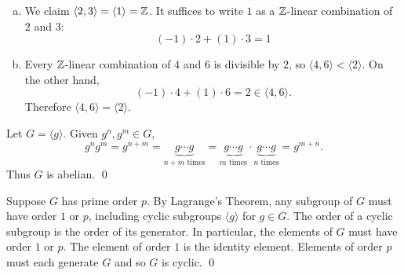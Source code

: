 \documentclass[../algebraNotesMSRI-UP2016.tex]{subfiles}
\begin{document}
\begin{frame}
\begin{enumerate}[(a)]
\item We claim $\langle 2,3\rangle=\langle 1\rangle=\mathbb Z$.  It suffices to write $1$ as a $\mathbb Z$-linear combination of $2$ and $3$:
\[
(-1)\cdot 2+(1)\cdot 3=1
\]
\item Every $\mathbb Z$-linear combination of $4$ and $6$ is divisible by $2$, so $\langle 4,6\rangle<\langle 2\rangle$.  On the other hand,
\[
(-1)\cdot 4 +(1)\cdot 6=2\in\langle 4,6\rangle.
\]
Therefore $\langle 4,6\rangle =\langle 2\rangle$.
\end{enumerate}

\smallGap
{}
Let $G=\langle g\rangle$.  Given $g^n,g^m\in G$,
\[
g^ng^m=g^{n+m}=\underbrace{g\cdots g}_{\text{$n+m$ times}}=\underbrace{g\cdots g}_{\text{$m$ times}}\cdot \underbrace{g\cdots g}_{\text{$n$ times}}=g^{m+n}.
\]
Thus $G$ is abelian.
\qed
\end{frame}

\begin{frame}[c]
Suppose $G$ has prime order $p$.  By Lagrange's Theorem, any subgroup of $G$ must have order $1$ or $p$, including cyclic subgroups $\langle g\rangle$ for $g\in G$.  The order of a cyclic subgroup is the order of its generator.  In particular, the elements of $G$ must have order $1$ or $p$.  The element of order $1$ is the identity element.  Elements of order $p$ must each generate $G$ and so $G$ is cyclic.
\qed
\end{frame}

\end{document}
